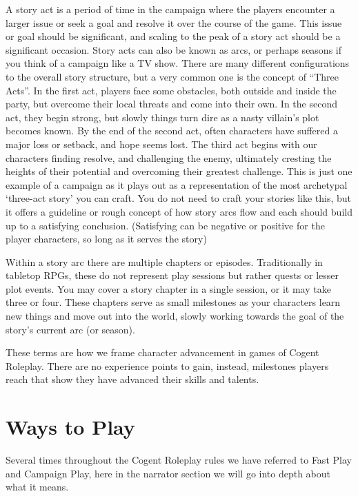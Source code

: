 A story act is a period of time in the campaign where the players encounter a larger issue or seek a goal and resolve it over the course of the game. This issue or goal should be significant, and scaling to the peak of a story act should be a significant occasion. Story acts can also be known as arcs, or perhaps seasons if you think of a campaign like a TV show. There are many different configurations to the overall story structure, but a very common one is the concept of “Three Acts”.   In the first act, players face some obstacles, both outside and inside the party, but overcome their local threats and come into their own. In the second act, they begin strong, but slowly things turn dire as a nasty villain’s plot becomes known. By the end of the second act, often characters have suffered a major loss or setback, and hope seems lost. The third act begins with our characters finding resolve, and challenging the enemy, ultimately cresting the heights of their potential and overcoming their greatest challenge. This is just one example of a campaign as it plays out as a representation of the most archetypal ‘three-act story’ you can craft. You do not need to craft your stories like this, but it offers a guideline or rough concept of how story arcs flow and each should build up to a satisfying conclusion. (Satisfying can be negative or positive for the player characters, so long as it serves the story)

Within a story arc there are multiple chapters or episodes. Traditionally in tabletop RPGs, these do not represent play sessions but rather quests or lesser plot events. You may cover a story chapter in a single session, or it may take three or four. These chapters serve as small milestones as your characters learn new things and move out into the world, slowly working towards the goal of the story's current arc (or season).

These terms are how we frame character advancement in games of Cogent Roleplay. There are no experience points to gain, instead, milestones players reach that show they have advanced their skills and talents.

\section{Ways to Play}

Several times throughout the Cogent Roleplay rules we have referred to Fast Play and Campaign Play, here in the narrator section we will go into depth about what it means.

